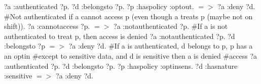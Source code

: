 \documentclass[conference]{IEEEtran}
\begin{document}
\newline
{?a :authenticated ?p. ?d :belongsto ?p. ?p :haspolicy :optout.}  $=>$ {?a :deny ?d}. \newline
\newline
\#Not authenticated if a cannot access p (even though a treats p (maybe not on shift)). \newline
\newline
{?a :cannotaccess ?p.}  $=>$ {?a :notauthenticated ?p}. \newline
\newline
\#If a is not authenticated to treat p, then access is denied \newline
\newline
{?a :notauthenticated ?p. ?d :belongsto ?p}  $=>$ {?a :deny ?d}. \newline
\newline
\#If a is authenticated, d belongs to p, p has a an optin \#except to sensitive data, and d is sensitive then a is denied \newline
\#access \newline
\newline
{?a :authenticated ?p. ?d :belongsto ?p. ?p :haspolicy :optinsens. ?d :hasnature :sensitive}  $=>$ {?a :deny ?d}. \newline



\end{document}
